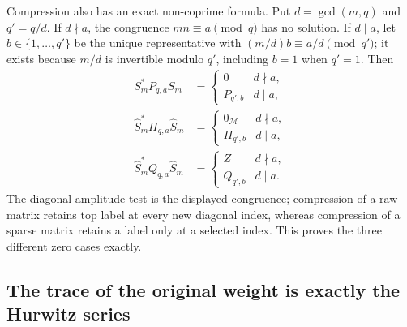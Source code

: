 Compression also has an exact non-coprime formula. Put
$d=\gcd(m,q)$ and $q'=q/d$. If $d\nmid a$, the congruence
$mn\equiv a\pmod q$ has no solution. If $d\mid a$, let
$b\in\{1,\ldots,q'\}$ be the unique representative with
$(m/d)b\equiv a/d\pmod{q'}$; it exists because $m/d$ is
invertible modulo $q'$, including $b=1$ when $q'=1$.
Then
\begin{equation}\tag{HCR25}
\begin{aligned}
 S_m^*P_{q,a}S_m
    &=\begin{cases}0&d\nmid a,\\P_{q',b}&d\mid a,\end{cases}\\
 \widehat S_m^*\Pi_{q,a}\widehat S_m
    &=\begin{cases}0_{\mathscr M}&d\nmid a,\\\Pi_{q',b}&d\mid a,\end{cases}\\
 \widehat S_m^*Q_{q,a}\widehat S_m
    &=\begin{cases}Z&d\nmid a,\\Q_{q',b}&d\mid a.\end{cases}
\end{aligned}
\end{equation}
The diagonal amplitude test is the displayed congruence;
compression of a raw matrix retains top label at every
new diagonal index, whereas compression of a sparse
matrix retains a label only at a selected index. This
proves the three different zero cases exactly.

\subsection{The trace of the original weight is exactly the Hurwitz series}

